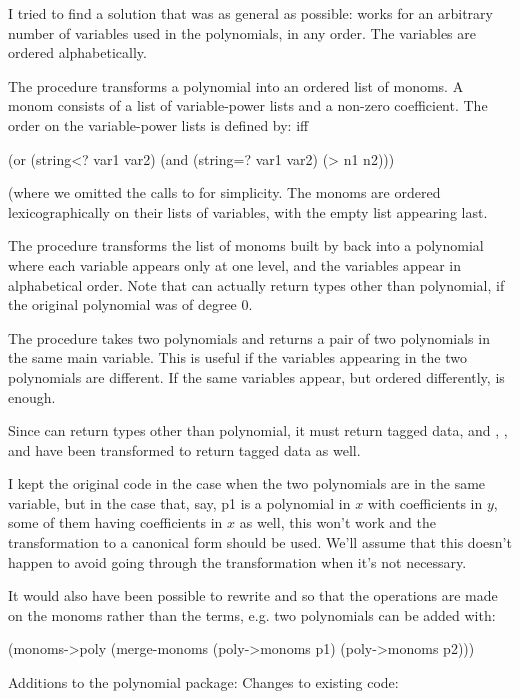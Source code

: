 \begin{exe}[2.92]
    I tried to find a solution that was as general as possible: works for an 
    arbitrary number of variables used in the polynomials, in any order. The 
    variables are ordered alphabetically.

    The  procedure transforms a polynomial into an ordered 
    list of monoms. A monom consists of a list of variable-power lists and 
    a non-zero coefficient.
    The order on the variable-power lists is defined by:
     iff
    \begin{cscm}
    (or (string<? var1 var2)
        (and (string=? var1 var2) (> n1 n2)))
    \end{cscm}
    (where we omitted the calls to  for simplicity.
    The monoms are ordered lexicographically on their lists of variables, with 
    the empty list appearing last.

    The  procedure transforms the list of monoms built by 
     back into a polynomial where each variable appears only 
    at one level, and the variables appear in alphabetical order. Note that 
     can actually return types other than polynomial, if the 
    original polynomial was of degree 0.

    The  procedure takes two polynomials and returns a pair 
    of two polynomials in the same main variable. This is useful if the 
    variables appearing in the two polynomials are different. If the same 
    variables appear, but ordered differently,  is enough.

    Since  can return types other than polynomial, it must 
    return tagged data, and , ,  
    and  have been transformed to return tagged data as well.

    \begin{comp}
        I kept the original code in the case when the two polynomials are in the 
        same variable, but in the case that, say, p1 is a polynomial in $x$ with 
        coefficients in $y$, some of them having coefficients in $x$ as well, this 
        won’t work and the transformation to a canonical form should be used. We’ll 
        assume that this doesn’t happen to avoid going through the transformation 
        when it’s not necessary.

        It would also have been possible to rewrite  and 
         so that the operations are made on the monoms rather than 
        the terms, e.g. two polynomials can be added with:
        \begin{cscm}
            (monoms->poly (merge-monoms (poly->monoms p1)
            (poly->monoms p2)))
        \end{cscm}
    \end{comp}

    Additions to the polynomial package:
    Changes to existing code:
\end{exe}

